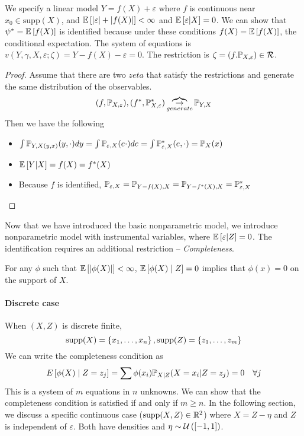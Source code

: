 \begin{exercise}
    We specify a linear model $Y=f(X)+\varepsilon$ where $f$ is continuous near $x_0 \in \text{supp}(X)$, and $\mathbb{E}\left[\left| \varepsilon\right|+\left| f(X)\right|\right]<\infty$ and $\mathbb{E}\left[\varepsilon|X\right]=0$. We can show that $\psi^*=\mathbb{E}\left[f(X)\right]$ is identified because under these conditions $f(X)=\mathbb{E}\left[f(X)\right]$, the conditional expectation. The system of equations is $v(Y,\gamma,X,\varepsilon;\zeta)=Y-f(X)-\varepsilon=0$. The restriction is $\zeta = (f.\mathbb{P}_{X,\varepsilon})\in \mathcal{R}$. 
\end{exercise}
\begin{proof}
     Assume that there are two $zeta$ that satisfy the restrictions and generate the same distribution of the observables. $$(f,\mathbb{P}_{X,\varepsilon}), (f^*,\mathbb{P}_{X,\varepsilon}^*) \overbrace{\to}_{generate} \mathbb{P}_{Y,X}$$
     Then we have the following \begin{itemize}
        \item $\int \mathbb{P}_{Y,X(y,x)}(y,\cdot)dy=\int \mathbb{P}_{\varepsilon,X}(e\cdot)de=\int \mathbb{P}^*_{\varepsilon,X}(e,\cdot)=\mathbb{P}_X(x)$
        \item $\mathbb{E}\left[Y|X\right]=f(X)=f^*(X)$
        \item Because $f$ is identified, $\mathbb{P}_{\varepsilon,X}=\mathbb{P}_{Y-f(X),X}=\mathbb{P}_{Y-f^*(X),X}=\mathbb{P}_{\varepsilon,X}^*$
     \end{itemize}
     
\end{proof}
Now that we have introduced the basic nonparametric model, we introduce nonparametric model with instrumental variables, where $\mathbb{E}\left[\varepsilon|Z\right]=0$. The identification requires an additional restriction -- \emph{Completeness}. 
\begin{definition}[Completeness]
    For any $\phi$ such that $\mathbb{E}\left[\left| \phi(X)\right|\right]<\infty$, $\mathbb{E}\left[\phi(X)\mid Z\right]=0$ implies that $\phi(x)=0$ on the support of $X$.
\end{definition}
\paragraph{Discrete case}
When $(X,Z)$ is discrete finite, $$\text{supp}(X)=\left\{x_1,\dots,x_n\right\}, \text{supp}(Z)=\left\{z_1,\dots,z_m\right\}$$
We can write the completeness condition as \begin{equation*}
    E\left[\phi(X)\mid Z=z_j\right]= \sum \phi(x_i)\mathbb{P}_{X|Z}(X=x_i|Z=z_j)=0 \quad \forall j
\end{equation*}
This is a system of $m$ equations in $n$ unknowns. We can show that the completeness condition is satisfied if and only if $m\ge n$. 
In the following section, we discuss a specific continuous case ($\text{supp}(X,Z)\in \mathbb{R}^2$) where $X=Z-\eta$ and $Z$ is independent of $\varepsilon$. Both have densities and  $\eta\sim \mathcal{U}\left([-1,1]\right)$.
    